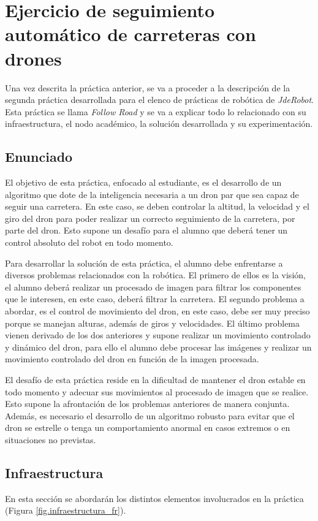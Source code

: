 \chapter{Ejercicio de seguimiento automático de carreteras con drones}\label{cap.followroad}
Una vez descrita la práctica anterior, se va a proceder a la descripción de la segunda práctica desarrollada para el elenco de prácticas de robótica de \textit{JdeRobot}. Esta práctica se llama \textit{Follow Road} y se va a explicar todo lo relacionado con su infraestructura, el nodo académico, la solución desarrollada y su experimentación.

\section{Enunciado}\label{sec.enunciado}
El objetivo de esta práctica, enfocado al estudiante, es el desarrollo de un algoritmo que dote de la inteligencia necesaria a un dron par que sea capaz de seguir una carretera. En este caso, se deben controlar la altitud, la velocidad y el giro del dron para poder realizar un correcto seguimiento de la carretera, por parte del dron. Esto supone un desafío para el alumno que deberá tener un control absoluto del robot en todo momento.

Para desarrollar la solución de esta práctica, el alumno debe enfrentarse a diversos problemas relacionados con la robótica. El primero de ellos es la visión, el alumno deberá realizar un procesado de imagen para filtrar los componentes que le interesen, en este caso, deberá filtrar la carretera. El segundo problema a abordar, es el control de movimiento del dron, en este caso, debe ser muy preciso porque se manejan alturas, además de giros y velocidades. El último problema vienen derivado de los dos anteriores y supone realizar un movimiento controlado y dinámico del dron, para ello el alumno debe procesar las imágenes y realizar un movimiento controlado del dron en función de la imagen procesada.

El desafío de esta práctica reside en la dificultad de mantener el dron estable en todo momento y adecuar sus movimientos al procesado de imagen que se realice. Esto supone la afrontación de los problemas anteriores de manera conjunta. Además, es necesario el desarrollo de un algoritmo robusto para evitar que el dron se estrelle o tenga un comportamiento anormal en casos extremos o en situaciones no previstas.

\section{Infraestructura}
En esta sección se abordarán los distintos elementos involucrados en la práctica (Figura \ref{fig.infraestructura_fr}).

